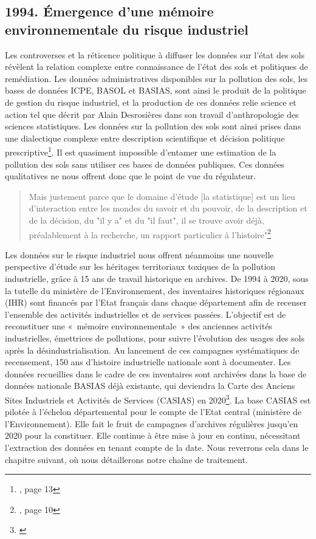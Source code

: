 \documentclass[a4paper,twoside,12pt]{book}
\begin{document}

\subsection{1994. Émergence d'une mémoire environnementale du risque industriel} 

Les controverses et la réticence politique à diffuser les données sur l'état des sols révèlent la relation complexe entre connaissance de l'état des sols et politiques de remédiation. Les données administratives disponibles sur la pollution des sols, les bases de données ICPE, BASOL et BASIAS, sont ainsi le produit de la politique de gestion du risque industriel, et la production de ces données relie science et action tel que décrit par Alain Desrosières dans son travail d'anthropologie des sciences statistiques. Les données sur la pollution des sols sont ainsi prises dans une dialectique complexe entre description scientifique et décision politique prescriptive\footnote{\cite{desrosieres_politique_2010}, page 13}. Il est quasiment impossible d'entamer une estimation de la pollution des sols sans utiliser ces bases de données publiques. Ces données qualitatives ne nous offrent donc que le point de vue du régulateur. 

\begin{quote}
Mais justement parce que le domaine d'étude [la statistique] est un lieu d'interaction entre les mondes du savoir et du pouvoir, de la description et de la décision, du "il y a" et du "il faut", il se trouve avoir déjà, préalablement à la recherche, un rapport particulier à l'histoire"\footnote{\cite{desrosieres_politique_2010}, page 10} 
\end{quote}
Les données sur le risque industriel nous offrent néanmoins une nouvelle perspective d'étude sur les héritages territoriaux toxiques de la pollution industrielle, grâce à 15 ans de travail historique en archives. De 1994 à 2020, sous la tutelle du ministère de l'Environnement, des inventaires historiques régionaux (IHR) sont financés par l'Etat français dans chaque département afin de recenser l'ensemble des activités industrielles et de services passées. L’objectif est de reconstituer une « mémoire environnementale » des anciennes activités industrielles, émettrices de pollutions, pour suivre l’évolution des usages des sols après la désindustrialisation. Au lancement de ces campagnes systématiques de recensement, 150 ans d'histoire industrielle nationale sont à documenter. Les données recueillies dans le cadre de ces inventaires sont archivées dans la base de données nationale BASIAS déjà existante, qui deviendra la Carte des Anciens Sites Industriels et Activités de Services (CASIAS) en 2020\footnote{\cite{brgm_casias_nodate}}. La base CASIAS est pilotée à l'échelon départemental pour le compte de l'Etat central (ministère de l'Environnement). Elle fait le fruit de campagnes d'archives régulières jusqu'en 2020 pour la constituer. Elle continue à être mise à jour en continu, nécessitant l'extraction des données en tenant compte de la date. Nous reverrons cela dans le chapitre suivant, où nous détaillerons notre chaîne de traitement.
\end{document}
